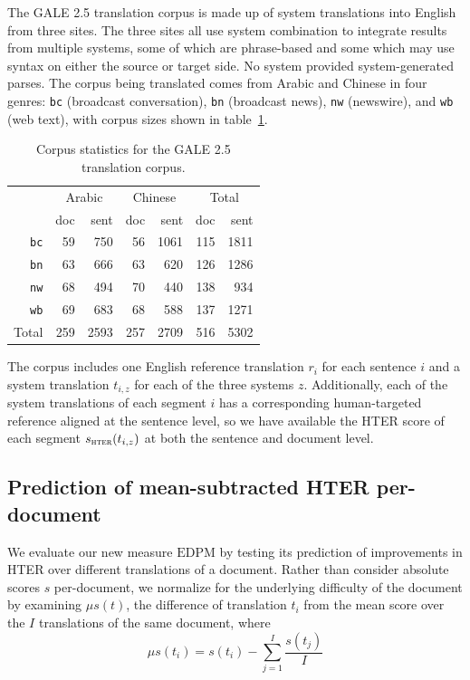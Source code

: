 \documentclass[11pt]{article}
\newcommand{\myEDPM}[0]{\ensuremath{\mathrm{EDPM}}}
\begin{document}
The GALE 2.5 translation corpus is made up of system translations into
English from three sites.
The three sites all use system combination to integrate results from
multiple systems, some of which are phrase-based and some which may
use syntax on either the source or target side. No system provided
system-generated parses.
%
The corpus being translated comes from
Arabic and Chinese in four genres: \texttt{bc} (broadcast
conversation), \texttt{bn} (broadcast news), \texttt{nw} (newswire),
and \texttt{wb} (web text), with corpus sizes shown in
table~\ref{tab:galestats}.
\begin{table}
  \centering
  \begin{tabular}{r|rr|rr|rr}
     & \multicolumn{2}{c|}{Arabic} & \multicolumn{2}{c|}{Chinese}
     & \multicolumn{2}{c}{Total}\\
     & doc & sent & doc & sent & doc   & sent\\
     \hline
     \texttt{bc}    & 59  & 750 & 56 & 1061 & 115 & 1811\\
     \texttt{bn}    & 63  & 666 & 63 & 620  & 126 & 1286\\
     \texttt{nw}    & 68  & 494 & 70 & 440  & 138 & 934 \\
     \texttt{wb}    & 69  & 683 & 68 & 588  & 137 & 1271\\
     \hline
     Total & 259 & 2593& 257& 2709 & 516 & 5302\\
  \end{tabular}
  \caption{Corpus statistics for the GALE 2.5 translation
    corpus.}
  \label{tab:galestats}
\end{table}
The corpus includes one English reference translation $r_i$
\cite{gale08phase2_5references} for each sentence $i$ and a system
translation $t_{i,z}$ for each of the three systems
$z$. Additionally, each of the system translations of each segment $i$
has a corresponding human-targeted reference aligned at the sentence
level, so we have available the HTER score of each segment
$s_{\textsc{hter}}(t_{i,z})$ at both the sentence and document level.

\subsection{Prediction of mean-subtracted HTER per-document}

We evaluate our new measure \myEDPM{} by testing its prediction of
improvements in HTER over different translations of a document.
Rather than consider absolute scores $s$ per-document, we normalize for
the underlying difficulty of the document by examining $\mu s(t)$, the difference
of translation $t_i$ from the mean score over the $I$ translations of
the same document, where 
\begin{equation}
  \label{eq:meansub}
  \mu s(t_i) = s(t_i) - \sum_{j=1}^I\frac{s(t_j)}{I}
\end{equation}
\end{document}
